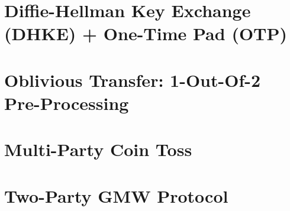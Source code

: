 \documentclass[11pt,hidelinks]{article}
\begin{document}
\section{Diffie-Hellman Key Exchange (DHKE) + One-Time Pad (OTP)}\label{sec:dhke_otp}


%

%

\section{Oblivious Transfer: 1-Out-Of-2 Pre-Processing}\label{sec:ot_pre}


\section{Multi-Party Coin Toss}\label{sec:coin}


\section{Two-Party GMW Protocol}\label{sec:gmw}

\end{document}
